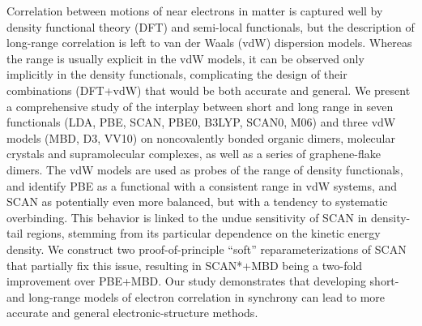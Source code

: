 Correlation between motions of near electrons in matter is captured well by density functional theory (DFT) and semi-local functionals, but the description of long-range correlation is left to van der Waals (vdW) dispersion models.
Whereas the range is usually explicit in the vdW models, it can be observed only implicitly in the density functionals, complicating the design of their combinations (DFT+vdW) that would be both accurate and general.
We present a comprehensive study of the interplay between short and long range in seven functionals (LDA, PBE, SCAN, PBE0, B3LYP, SCAN0, M06) and three vdW models (MBD, D3, VV10) on noncovalently bonded organic dimers, molecular crystals and supramolecular complexes, as well as a series of graphene-flake dimers.
The vdW models are used as probes of the range of density functionals, and identify PBE as a functional with a consistent range in vdW systems, and SCAN as potentially even more balanced, but with a tendency to systematic overbinding.
This behavior is linked to the undue sensitivity of SCAN in density-tail regions, stemming from its particular dependence on the kinetic energy density.
We construct two proof-of-principle ``soft'' reparameterizations of SCAN that partially fix this issue, resulting in SCAN*+MBD being a two-fold improvement over PBE+MBD\@.
Our study demonstrates that developing short- and long-range models of electron correlation in synchrony can lead to more accurate and general electronic-structure methods.

